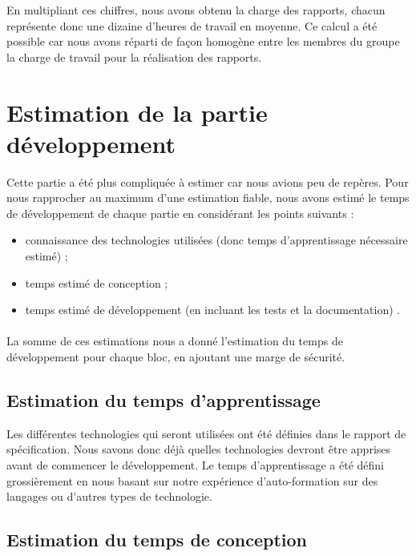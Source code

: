 En multipliant ces chiffres, nous avons obtenu la charge des rapports, chacun représente donc une dizaine d’heures de travail en moyenne. Ce calcul a été possible car nous avons réparti de façon homogène entre les membres du groupe la charge de travail pour la réalisation des rapports.

\section{Estimation de la partie développement}

Cette partie a été plus compliquée à estimer car nous avions peu de repères. Pour nous rapprocher au maximum d’une estimation fiable, nous avons estimé le temps de développement de chaque partie en considérant les points suivants : 

\begin{itemize}
\item connaissance des technologies utilisées (donc temps d’apprentissage nécessaire estimé) ;
\item temps estimé de conception ;
\item temps estimé de développement (en incluant les tests et la documentation) .
\end{itemize}

\paragraph{}

La somme de ces estimations nous a donné l’estimation du temps de développement pour chaque bloc, en ajoutant une marge de sécurité.

\subsection{Estimation du temps d'apprentissage}

Les différentes technologies qui seront utilisées ont été définies dans le rapport de spécification. Nous savons donc déjà quelles technologies devront être apprises avant de commencer le développement. Le temps d’apprentissage a été défini grossièrement en nous basant sur notre expérience d’auto-formation sur des langages ou d’autres types de technologie.

\subsection{Estimation du temps de conception}

